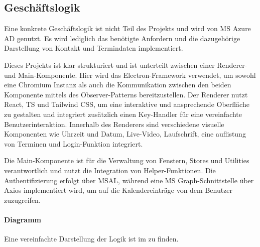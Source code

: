 \subsection{Geschäftslogik}
\label{sec:Geschaeftslogik}

Eine konkrete Geschäftslogik ist nicht Teil des Projekts und wird von \ac{MS} Azure \ac{AD} genutzt.
Es wird lediglich das benötigte Anfordern und die dazugehörige Darstellung von Kontakt und Termindaten implementiert.

Dieses Projekts ist klar strukturiert und ist unterteilt zwischen einer Renderer- und Main-Komponente.
Hier wird das Electron-Framework verwendet, um sowohl eine Chromium Instanz als auch die Kommunikation zwischen den beiden Komponente mittels des Observer-Patterns bereitzustellen.
Der Renderer nutzt React, \ac{TS} und Tailwind \ac{CSS}, um eine interaktive und ansprechende Oberfläche zu gestalten und integriert zusätzlich einen Key-Handler für eine vereinfachte Benutzerinteraktion.
Innerhalb des Renderers sind verschiedene visuelle Komponenten wie Uhrzeit und Datum, Live-Video, Laufschrift, eine auflistung von Terminen und Login-Funktion integriert.

Die Main-Komponente ist für die Verwaltung von Fenstern, Stores und Utilities verantwortlich und nutzt die Integration von Helper-Funktionen.
Die Authentifizierung erfolgt über \ac{MSAL}, während eine \ac{MS} Graph-Schnittstelle über Axios implementiert wird, um auf die Kalendereinträge von dem Benutzer zuzugreifen.

\paragraph{Diagramm}
Eine vereinfachte Darstellung der Logik ist im  zu finden.




